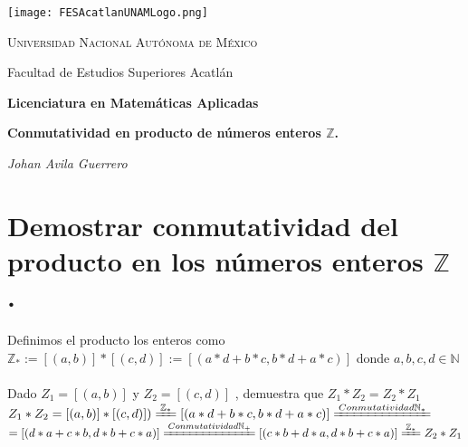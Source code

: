 \documentclass[a4paper,12pt]{article}
\begin{document}
\begin{titlepage}
    \centering
    \texttt{[image: FESAcatlanUNAMLogo.png]} %
    \vspace{1cm}
    
    {\scshape\large Universidad Nacional Autónoma de México \par}
    {\large Facultad de Estudios Superiores Acatlán \par}
    \vspace{1.5cm}
    
    {\Large\bfseries Licenciatura en Matemáticas Aplicadas \par}
    \vspace{2cm}
    
    {\Huge\bfseries  Conmutatividad en producto de números enteros \(\mathbb{Z}\).

    \par}
    \vspace{2cm}
    
    {\Large\itshape Johan Avila Guerrero \par}
    \vfill
    
    
    \vfill
    
\end{titlepage}



\section*{Demostrar conmutatividad del producto en los números enteros \(\mathbb{Z}\) .}
\noindent  Definimos el producto los enteros como \(\mathbb{Z}_{*} := [(a,b)] * [(c,d)] := [(a * d + b * c, b * d+ a * c)] \) donde \(a,b,c,d \in \mathbb{N}\)  \\ \\


Dado \(Z_{1} = [(a,b)]\) y \(Z_{2} = [(c,d)]\) , demuestra que \(Z_{1}  * Z_{2}   =  Z_{2}  * Z_{1}   \) \\

 \(Z_{1}  * Z_{2}   =  [(a,b)]  * [(c,d)])    \xlongequal[]{ \mathbb{Z}_{*}}   [(a * d + b * c, b * d+ a * c)] \xlongequal[]{ Conmutatividad \mathbb{N}_{*}}\)\\ 


\(= [(d* a +  c* b, d* b+ c * a)]  \xlongequal[]{ Conmutatividad \mathbb{N}_{+}}  [( c* b + d* a , d* b+ c * a)] \xlongequal[]{ \mathbb{Z}_{*}} Z_{2} * Z_{1} \)   
 
\end{document}
